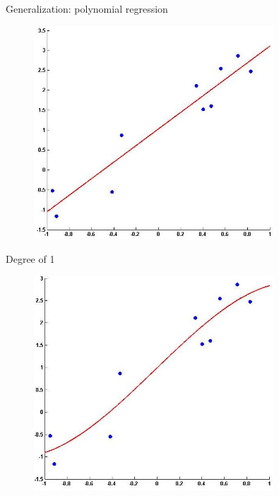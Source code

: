 \documentclass[serif, aspectratio=169]{beamer}
\begin{document}
\begin{frame}{Generalization: polynomial regression}
    \begin{minipage}{0.45\textwidth}
        \centering
        \begin{figure}[h]
        \includegraphics[width=0.8\textwidth]{pic/Polynomial_regression/degree_1.png}
        \end{figure}
        \begin{center}
            Degree of 1
        \end{center}
    \end{minipage}%
    \begin{minipage}{0.45\textwidth}
        \centering
        \begin{figure}[h]
        \includegraphics[width=0.8\textwidth]{pic/Polynomial_regression/degree_3.png}

\end{figure}
\end{minipage}
\end{frame}
\end{document}
